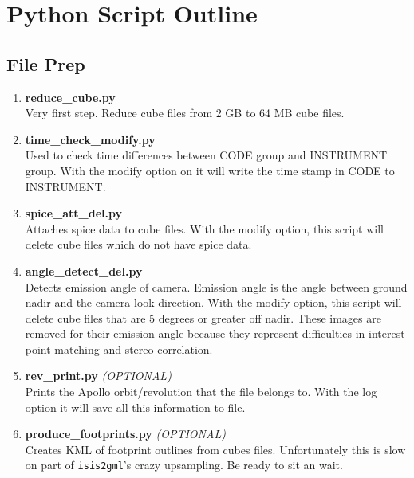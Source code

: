 \documentclass[12pt]{article}
\begin{document}
\section*{Python Script Outline}

\subsection*{File Prep}

\begin{enumerate}

\item \textbf{reduce\_cube.py} \hfill \\
  Very first step. Reduce cube files from 2 GB to 64 MB cube files.

\item \textbf{time\_check\_modify.py} \hfill \\
  Used to check time differences between CODE group and INSTRUMENT group. With the modify option on it will write the time stamp in CODE to INSTRUMENT.

\item \textbf{spice\_att\_del.py} \hfill \\
  Attaches spice data to cube files. With the modify option, this script will delete cube files which do not have spice data.

\item \textbf{angle\_detect\_del.py} \hfill \\
  Detects emission angle of camera. Emission angle is the angle between ground nadir and the camera look direction. With the modify option, this script will delete cube files that are 5 degrees or greater off nadir. These images are removed for their emission angle because they represent difficulties in interest point matching and stereo correlation.

\item \textbf{rev\_print.py} \emph{(OPTIONAL)} \hfill \\
  Prints the Apollo orbit/revolution that the file belongs to. With the log option it will save all this information to file.

\item \textbf{produce\_footprints.py} \emph{(OPTIONAL)} \hfill \\
  Creates KML of footprint outlines from cubes files. Unfortunately this is slow on part of \verb#isis2gml#'s crazy upsampling. Be ready to sit an wait.

\end{enumerate}
\end{document}
